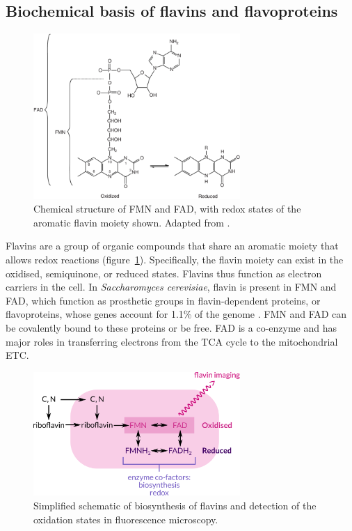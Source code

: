 \subsection{Biochemical basis of flavins and flavoproteins}
\label{subsec:intro-flavin-biochem}

\begin{figure}
  \centering
  \includegraphics[width=0.7\textwidth]{patelFlavinContainingOxidativeBiocatalysts2006_1}
  \caption{
    Chemical structure of FMN and FAD, with redox states of the aromatic flavin moiety shown.
    Adapted from \citet{patelFlavinContainingOxidativeBiocatalysts2006}.}
  \label{fig:intro-flavin-structure}
\end{figure}

Flavins are a group of organic compounds that share an aromatic moiety that allows redox reactions (figure~\ref{fig:intro-flavin-structure}).
Specifically, the flavin moiety can exist in the oxidised, semiquinone, or reduced states.
Flavins thus function as electron carriers in the cell.
In \emph{Saccharomyces cerevisiae}, flavin is present in FMN and FAD, which function as prosthetic groups in flavin-dependent proteins, or flavoproteins, whose genes account for 1.1\% of the genome \citep{gudipatiFlavoproteomeYeastSaccharomyces2014}.
FMN and FAD can be covalently bound to these proteins or be free.
FAD is a co-enzyme and has major roles in transferring electrons from the TCA cycle to the mitochondrial ETC.


\begin{figure}
  \centering
  \includegraphics[width=0.7\textwidth]{flavin-cell-schematic}
  \caption{
    Simplified schematic of biosynthesis of flavins and detection of the oxidation states in fluorescence microscopy.
    }
  \label{fig:intro-flavin-schematic}
\end{figure}

